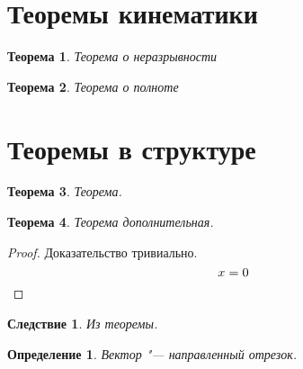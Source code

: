 \documentclass[a4paper, 12pt]{article}
\theoremstyle{plain}
\newtheorem{theorem}{Теорема}[section] %
\newtheorem{corollary}{Следствие}[theorem]
\newtheorem*{definition}{Определение} %
\begin{document}
    \section{Теоремы кинематики}

    \begin{theorem}
        Теорема о неразрывности
    \end{theorem}

    \begin{theorem}
        Теорема о полноте
    \end{theorem}


    \section{Теоремы в структуре}

    \begin{theorem}
        Теорема.
    \end{theorem}
    
    \begin{theorem}
        Теорема дополнительная.
    \end{theorem}

    \begin{proof}
        Доказательство тривиально.
        \[x = 0 \qedhere\] %
    \end{proof}

    \begin{corollary}
        Из теоремы.
    \end{corollary}

    \begin{definition}
        Вектор "--- направленный отрезок.
    \end{definition}
\end{document}
